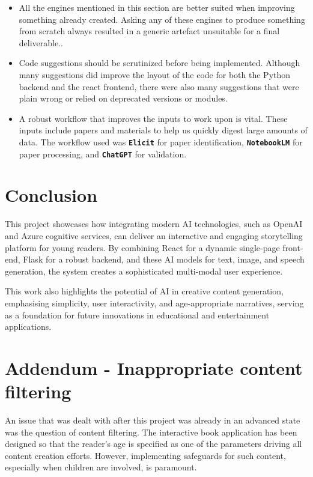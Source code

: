 \documentclass[conference]{IEEEtran}
\begin{document}
	\begin{itemize}
		\item All the engines mentioned in this section are better suited when improving something already created. Asking any of these engines to produce something from scratch always resulted in a generic artefact unsuitable for a final deliverable..
		
		\item Code suggestions should be scrutinized before being implemented. Although many suggestions did improve the layout of the code for both the Python backend and the react frontend, there were also many suggestions that were plain wrong or relied on deprecated versions or modules. 
		
		\item A robust workflow that improves the inputs to work upon is vital. These inputs include papers and materials to help us quickly digest large amounts of data. The workflow used was \textbf{\texttt{Elicit}} for paper identification, \textbf{\texttt{NotebookLM}} for paper processing, and \textbf{\texttt{ChatGPT}} for validation.
	\end{itemize}


	\section{Conclusion}
	
	This project showcases how integrating modern AI technologies, such as OpenAI and Azure cognitive services, can deliver an interactive and engaging storytelling platform for young readers. By combining React for a dynamic single-page front-end, Flask for a robust backend, and these AI models for text, image, and speech generation, the system creates a sophisticated multi-modal user experience. 
	
	This work also highlights the potential of AI in creative content generation, emphasising simplicity, user interactivity, and age-appropriate narratives, serving as a foundation for future innovations in educational and entertainment applications.

	
	\section{Addendum - Inappropriate content filtering}
	
	An issue that was dealt with after this project was already in an advanced state was the question of content filtering. The interactive book application has been designed so that the reader's age is specified as one of the parameters driving all content creation efforts. However, implementing safeguards for such content, especially when children are involved, is paramount.
	
\end{document}

